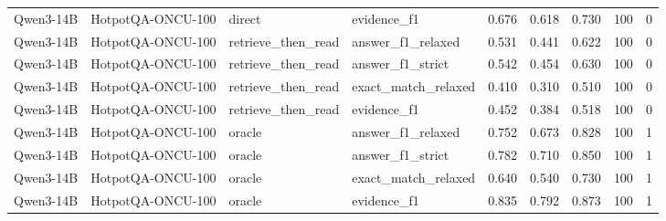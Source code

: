 \begin{tabular}{llllrrrrr}
Qwen3-14B & HotpotQA-ONCU-100 & direct & evidence_f1 & 0.676 & 0.618 & 0.730 & 100 & 0 \\
Qwen3-14B & HotpotQA-ONCU-100 & retrieve_then_read & answer_f1_relaxed & 0.531 & 0.441 & 0.622 & 100 & 0 \\
Qwen3-14B & HotpotQA-ONCU-100 & retrieve_then_read & answer_f1_strict & 0.542 & 0.454 & 0.630 & 100 & 0 \\
Qwen3-14B & HotpotQA-ONCU-100 & retrieve_then_read & exact_match_relaxed & 0.410 & 0.310 & 0.510 & 100 & 0 \\
Qwen3-14B & HotpotQA-ONCU-100 & retrieve_then_read & evidence_f1 & 0.452 & 0.384 & 0.518 & 100 & 0 \\
Qwen3-14B & HotpotQA-ONCU-100 & oracle & answer_f1_relaxed & 0.752 & 0.673 & 0.828 & 100 & 1 \\
Qwen3-14B & HotpotQA-ONCU-100 & oracle & answer_f1_strict & 0.782 & 0.710 & 0.850 & 100 & 1 \\
Qwen3-14B & HotpotQA-ONCU-100 & oracle & exact_match_relaxed & 0.640 & 0.540 & 0.730 & 100 & 1 \\
Qwen3-14B & HotpotQA-ONCU-100 & oracle & evidence_f1 & 0.835 & 0.792 & 0.873 & 100 & 1 \\
\bottomrule
\end{tabular}
